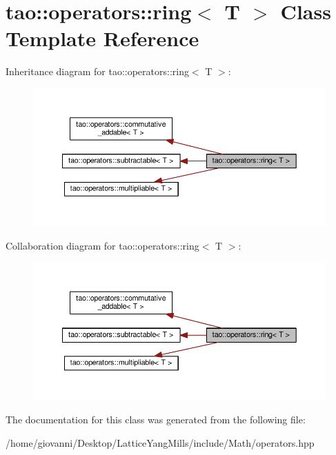 \hypertarget{classtao_1_1operators_1_1ring_3_01T_01_4}{}\section{tao\+:\+:operators\+:\+:ring$<$ T $>$ Class Template Reference}
\label{classtao_1_1operators_1_1ring_3_01T_01_4}


Inheritance diagram for tao\+:\+:operators\+:\+:ring$<$ T $>$\+:\nopagebreak
\begin{figure}[H]
\begin{center}
\leavevmode
\includegraphics[width=350pt]{classtao_1_1operators_1_1ring_3_01T_01_4__inherit__graph}
\end{center}
\end{figure}


Collaboration diagram for tao\+:\+:operators\+:\+:ring$<$ T $>$\+:\nopagebreak
\begin{figure}[H]
\begin{center}
\leavevmode
\includegraphics[width=350pt]{classtao_1_1operators_1_1ring_3_01T_01_4__coll__graph}
\end{center}
\end{figure}


The documentation for this class was generated from the following file\+:\begin{DoxyCompactItemize}
\item 
/home/giovanni/\+Desktop/\+Lattice\+Yang\+Mills/include/\+Math/operators.\+hpp\end{DoxyCompactItemize}
